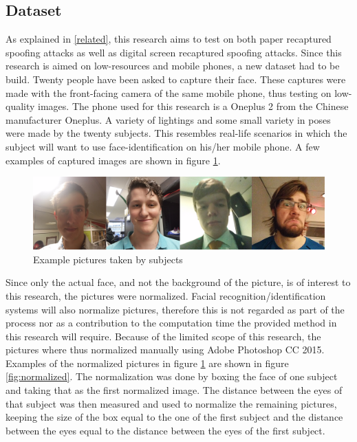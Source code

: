 \documentclass{sig-alternate-br}
\begin{document}
\subsection{Dataset} \label{dataset}
As explained in \ref{related}, this research aims to test on both paper recaptured spoofing attacks as well as digital screen recaptured spoofing attacks. Since this research is aimed on low-resources and mobile phones, a new dataset had to be build. Twenty people have been asked to capture their face. These captures were made with the front-facing camera of the same mobile phone, thus testing on low-quality images. The phone used for this research is a Oneplus 2 from the Chinese manufacturer Oneplus. A variety of lightings and some small variety in poses were made by the twenty subjects. This resembles real-life scenarios in which the subject will want to use face-identification on his/her mobile phone. A few examples of captured images are shown in figure \ref{fig:pictures}.

\begin{figure}[h]
	\includegraphics[scale=0.2]{pictures}
	\caption{Example pictures taken by subjects}
	\label{fig:pictures}
\end{figure}

Since only the actual face, and not the background of the picture, is of interest to this research, the pictures were normalized. Facial recognition/identification systems will also normalize pictures, therefore this is not regarded as part of the process nor as a contribution to the computation time the provided method in this research will require. Because of the limited scope of this research, the pictures where thus normalized manually using Adobe Photoshop CC 2015. Examples of the normalized pictures in figure \ref{fig:pictures} are shown in figure \ref{fig:normalized}. The normalization was done by boxing the face of one subject and taking that as the first normalized image. The distance between the eyes of that subject was then measured and used to normalize the remaining pictures, keeping the size of the box equal to the one of the first subject and the distance between the eyes equal to the distance between the eyes of the first subject.
\end{document}
